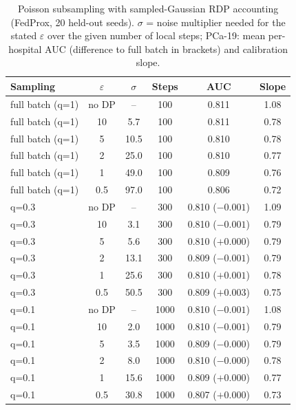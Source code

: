 \begin{table}[t]
\caption{Poisson subsampling with sampled-Gaussian RDP accounting (FedProx, 20 held-out seeds). $\sigma$ = noise multiplier needed for the stated $\varepsilon$ over the given number of local steps; PCa-19: mean per-hospital AUC (difference to full batch in brackets) and calibration slope.}
\centering\scriptsize
\setlength{\tabcolsep}{3pt}
\begin{tabular}{lccccc}
\toprule
Sampling & $\varepsilon$ & $\sigma$ & Steps & AUC & Slope \\
\midrule
full batch (q=1) & no DP & -- & 100 & 0.811 & 1.08 \\
full batch (q=1) & 10 & 5.7 & 100 & 0.811 & 0.78 \\
full batch (q=1) & 5 & 10.5 & 100 & 0.810 & 0.78 \\
full batch (q=1) & 2 & 25.0 & 100 & 0.810 & 0.77 \\
full batch (q=1) & 1 & 49.0 & 100 & 0.809 & 0.76 \\
full batch (q=1) & 0.5 & 97.0 & 100 & 0.806 & 0.72 \\
\midrule
q=0.3 & no DP & -- & 300 & 0.810 ($-0.001$) & 1.09 \\
q=0.3 & 10 & 3.1 & 300 & 0.810 ($-0.001$) & 0.79 \\
q=0.3 & 5 & 5.6 & 300 & 0.810 ($+0.000$) & 0.79 \\
q=0.3 & 2 & 13.1 & 300 & 0.809 ($-0.001$) & 0.79 \\
q=0.3 & 1 & 25.6 & 300 & 0.810 ($+0.001$) & 0.78 \\
q=0.3 & 0.5 & 50.5 & 300 & 0.809 ($+0.003$) & 0.75 \\
\midrule
q=0.1 & no DP & -- & 1000 & 0.810 ($-0.001$) & 1.08 \\
q=0.1 & 10 & 2.0 & 1000 & 0.810 ($-0.001$) & 0.79 \\
q=0.1 & 5 & 3.5 & 1000 & 0.809 ($-0.000$) & 0.79 \\
q=0.1 & 2 & 8.0 & 1000 & 0.810 ($-0.000$) & 0.78 \\
q=0.1 & 1 & 15.6 & 1000 & 0.809 ($+0.000$) & 0.77 \\
q=0.1 & 0.5 & 30.8 & 1000 & 0.807 ($+0.000$) & 0.73 \\
\bottomrule
\end{tabular}
\label{tab:subsampling}
\end{table}
